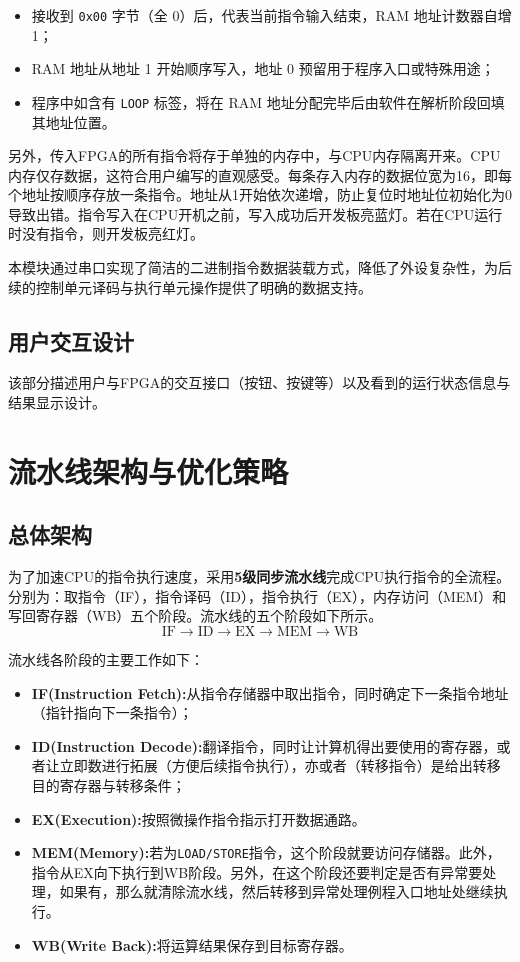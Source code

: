 \documentclass[lang=cn,a4paper,newtx]{elegantpaper}
\begin{document}
\begin{itemize}
  \item 接收到 \texttt{0x00} 字节（全 0）后，代表当前指令输入结束，RAM 地址计数器自增 1；
  \item RAM 地址从地址 1 开始顺序写入，地址 0 预留用于程序入口或特殊用途；
  \item 程序中如含有 \texttt{LOOP} 标签，将在 RAM 地址分配完毕后由软件在解析阶段回填其地址位置。
\end{itemize}

另外，传入FPGA的所有指令将存于单独的内存中，与CPU内存隔离开来。CPU内存仅存数据，这符合用户编写的直观感受。每条存入内存的数据位宽为16，即每个地址按顺序存放一条指令。地址从1开始依次递增，防止复位时地址位初始化为0导致出错。指令写入在CPU开机之前，写入成功后开发板亮蓝灯。若在CPU运行时没有指令，则开发板亮红灯。

本模块通过串口实现了简洁的二进制指令数据装载方式，降低了外设复杂性，为后续的控制单元译码与执行单元操作提供了明确的数据支持。

\subsection{用户交互设计}
该部分描述用户与FPGA的交互接口（按钮、按键等）以及看到的运行状态信息与结果显示设计。
\section{流水线架构与优化策略}
\subsection{总体架构}
为了加速CPU的指令执行速度，采用\textbf{5级同步流水线}完成CPU执行指令的全流程。分别为：取指令（IF），指令译码（ID），指令执行（EX），内存访问（MEM）和写回寄存器（WB）五个阶段。流水线的五个阶段如下所示。
$$
  \text{IF} \rightarrow \text{ID} \rightarrow \text{EX} \rightarrow \text{MEM} \rightarrow \text{WB}
$$

流水线各阶段的主要工作如下：
\begin{itemize}
  \item \textbf{IF(Instruction Fetch):}从指令存储器中取出指令，同时确定下一条指令地址（指针指向下一条指令）；
  \item \textbf{ID(Instruction Decode):}翻译指令，同时让计算机得出要使用的寄存器，或者让立即数进行拓展（方便后续指令执行），亦或者（转移指令）是给出转移目的寄存器与转移条件；
  \item \textbf{EX(Execution):}按照微操作指令指示打开数据通路。
  \item \textbf{MEM(Memory):}若为\texttt{LOAD/STORE}指令，这个阶段就要访问存储器。此外，指令从EX向下执行到WB阶段。另外，在这个阶段还要判定是否有异常要处理，如果有，那么就清除流水线，然后转移到异常处理例程入口地址处继续执行。
  \item \textbf{WB(Write Back):}将运算结果保存到目标寄存器。
\end{itemize}
\end{document}
